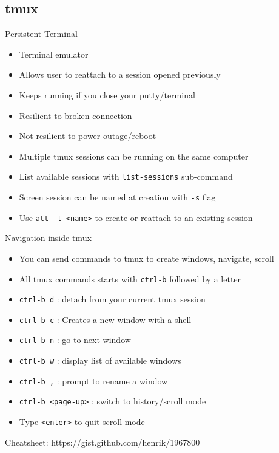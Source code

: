 \subsection{tmux}

\begin{frame}{Persistent Terminal}
\begin{itemize}
\item Terminal emulator
\item Allows user to reattach to a session opened previously
\item Keeps running if you close your putty/terminal
\item Resilient to broken connection
\item Not resilient to power outage/reboot
\item Multiple tmux sessions can be running on the same computer
\item List available sessions with \texttt{list-sessions} sub-command
\item Screen session can be named at creation with \texttt{-s} flag
\item Use \texttt{att -t <name>} to create or reattach to an existing session
\end{itemize}
\end{frame}

\begin{frame}{Navigation inside tmux}
\begin{itemize}
\item You can send commands to tmux to create windows, navigate, scroll
\item All tmux commands starts with \texttt{ctrl-b} followed by a letter
\item \texttt{ctrl-b d} : detach from your current tmux session
\item \texttt{ctrl-b c} : Creates a new window with a shell
\item \texttt{ctrl-b n} : go to next window
\item \texttt{ctrl-b w} : display list of available windows
\item \texttt{ctrl-b ,} : prompt to rename a window
\item \texttt{ctrl-b <page-up>} : switch to history/scroll mode
\item Type \texttt{<enter>} to quit scroll mode
\end{itemize}
\pause
Cheatsheet: https://gist.github.com/henrik/1967800
\end{frame}

